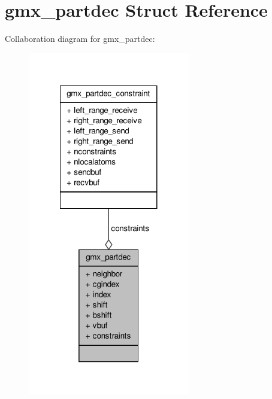 \hypertarget{structgmx__partdec}{\section{gmx\-\_\-partdec \-Struct \-Reference}
\label{structgmx__partdec}
}


\-Collaboration diagram for gmx\-\_\-partdec\-:
\nopagebreak
\begin{figure}[H]
\begin{center}
\leavevmode
\includegraphics[width=200pt]{structgmx__partdec__coll__graph}
\end{center}
\end{figure}
